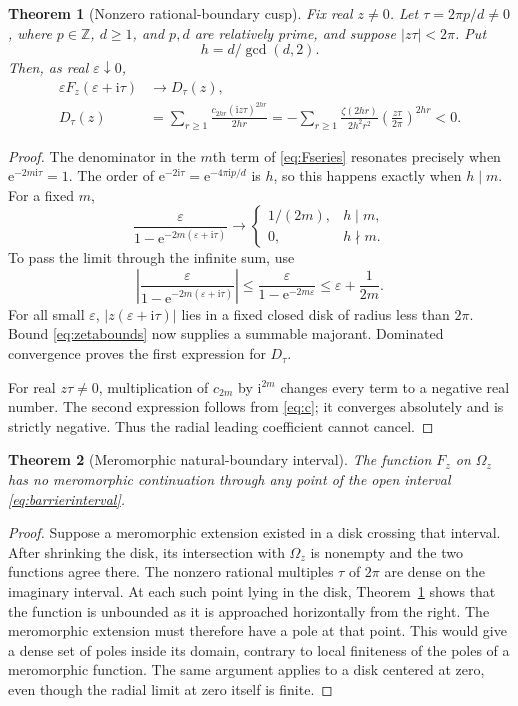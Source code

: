 \documentclass[11pt,a4paper]{article}
\numberwithin{equation}{section}
\newtheorem{theorem}{Theorem}[section]
\theoremstyle{definition}
\theoremstyle{remark}
\newcommand{\ii}{\mathrm i}
\newcommand{\e}{\mathrm e}
\begin{document}
\begin{theorem}[Nonzero rational-boundary cusp]
\label{thm:cusp}
Fix real $z\ne0$. Let $\tau=2\pi p/d\ne0$, where $p\in\mathbb Z$, $d\ge1$, and $p,d$ are relatively prime, and suppose $|z\tau|<2\pi$. Put
\begin{equation}
 h=d/\gcd(d,2).
 \label{eq:h}
\end{equation}
Then, as real $\varepsilon\downarrow0$,
\begin{align}
 \varepsilon F_z(\varepsilon+\ii\tau)&\longrightarrow D_\tau(z),\label{eq:radiallimit}\\
 D_\tau(z)&=\sum_{r\ge1}\frac{c_{2hr}(\ii z\tau)^{2hr}}{2hr}
 =-\sum_{r\ge1}\frac{\zeta(2hr)}{2h^2r^2}
                   \left(\frac{z\tau}{2\pi}\right)^{2hr}<0.
 \label{eq:D}
\end{align}
\end{theorem}
\begin{proof}
The denominator in the $m$th term of \eqref{eq:Fseries} resonates precisely when $\e^{-2m\ii\tau}=1$. The order of $\e^{-2\ii\tau}=\e^{-4\pi\ii p/d}$ is $h$, so this happens exactly when $h\mid m$. For a fixed $m$,
\[
 \frac{\varepsilon}{1-\e^{-2m(\varepsilon+\ii\tau)}}
 \longrightarrow
 \begin{cases}1/(2m),&h\mid m,\\0,&h\nmid m.\end{cases}
\]
To pass the limit through the infinite sum, use
\[
 \left|\frac{\varepsilon}{1-\e^{-2m(\varepsilon+\ii\tau)}}\right|
 \le\frac{\varepsilon}{1-\e^{-2m\varepsilon}}
 \le\varepsilon+\frac1{2m}.
\]
For all small $\varepsilon$, $|z(\varepsilon+\ii\tau)|$ lies in a fixed closed disk of radius less than $2\pi$. Bound \eqref{eq:zetabounds} now supplies a summable majorant. Dominated convergence proves the first expression for $D_\tau$.

For real $z\tau\ne0$, multiplication of $c_{2m}$ by $\ii^{2m}$ changes every term to a negative real number. The second expression follows from \eqref{eq:c}; it converges absolutely and is strictly negative. Thus the radial leading coefficient cannot cancel.
\end{proof}

\begin{theorem}[Meromorphic natural-boundary interval]
\label{thm:natural}
The function $F_z$ on $\Omega_z$ has no meromorphic continuation through any point of the open interval \eqref{eq:barrierinterval}.
\end{theorem}
\begin{proof}
Suppose a meromorphic extension existed in a disk crossing that interval. After shrinking the disk, its intersection with $\Omega_z$ is nonempty and the two functions agree there. The nonzero rational multiples $\tau$ of $2\pi$ are dense on the imaginary interval. At each such point lying in the disk, Theorem~\ref{thm:cusp} shows that the function is unbounded as it is approached horizontally from the right. The meromorphic extension must therefore have a pole at that point. This would give a dense set of poles inside its domain, contrary to local finiteness of the poles of a meromorphic function. The same argument applies to a disk centered at zero, even though the radial limit at zero itself is finite.
\end{proof}
\end{document}
